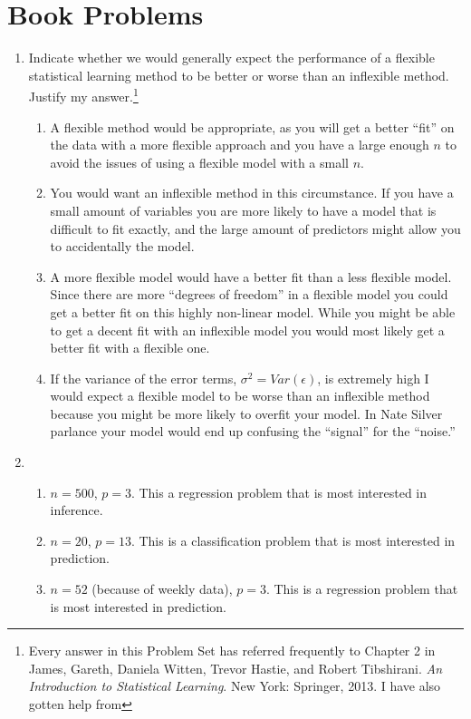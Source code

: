 \documentclass[11pt]{article}
\begin{document}
    
    
\bigskip

\section*{Book Problems}

\begin{enumerate}
  \item Indicate whether we would generally expect the performance of a flexible statistical learning method to be better or worse than an inflexible method. Justify my answer.\footnote{Every answer in this Problem Set has referred frequently to Chapter 2 in James, Gareth, Daniela Witten, Trevor Hastie, and Robert Tibshirani. \emph{An Introduction to Statistical Learning}. New York: Springer, 2013. I have also gotten help from }
  \begin{enumerate}
    \item A flexible method would be appropriate, as you will get a better ``fit'' on the data with a more flexible approach and you have a large enough $n$ to avoid the issues of using a flexible model with a small $n$.
    \item You would want an inflexible method in this circumstance. If you have a small amount of variables you are more likely to have a model that is difficult to fit exactly, and the large amount of predictors might allow you to accidentally the model.
    \item A more flexible model would have a better fit than a less flexible model. Since there are more ``degrees of freedom'' in a flexible model you could get a better fit on this highly non-linear model. While you might be able to get a decent fit with an inflexible model you would most likely get a better fit with a flexible one.
    \item If the variance of the error terms, $\sigma^2 = Var(\epsilon)$, is extremely high I would expect a flexible model to be worse than an inflexible method because you might be more likely to overfit your model. In Nate Silver parlance your model would end up confusing the ``signal'' for the ``noise.''
  \end{enumerate}

  \item 
    \begin{enumerate}
      \item $n = 500$, $p = 3$. This a regression problem that is most interested in inference.
      \item $n = 20$, $p = 13$. This is a classification problem that is most interested in prediction.
      \item $n = 52$ (because of weekly data), $p = 3$. This is a regression problem that is most interested in prediction.
    \end{enumerate}
  

\end{enumerate}
\end{document}
